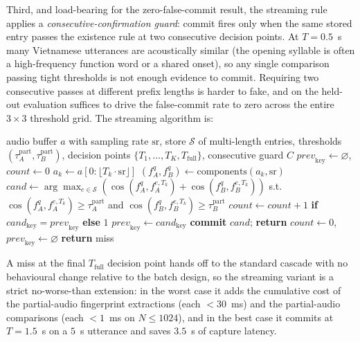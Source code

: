 \documentclass[a4paper,fleqn]{cas-dc}
\begin{document}
Third, and load-bearing for the zero-false-commit result, the streaming rule applies a \emph{consecutive-confirmation guard}: commit fires only when the same stored entry passes the existence rule at two consecutive decision points. At $T = 0.5$~s many Vietnamese utterances are acoustically similar (the opening syllable is often a high-frequency function word or a shared onset), so any single comparison passing tight thresholds is not enough evidence to commit. Requiring two consecutive passes at different prefix lengths is harder to fake, and on the held-out evaluation suffices to drive the false-commit rate to zero across the entire $3\times3$ threshold grid. The streaming algorithm is:

\begin{algorithm}[!h]
\caption{Streaming progressive two-stream cache lookup}
\label{alg:streaming}
\begin{algorithmic}[1]
\Require audio buffer $a$ with sampling rate $\mathrm{sr}$, store $\mathcal{S}$ of multi-length entries, thresholds $(\tau^{\mathrm{part}}_A, \tau^{\mathrm{part}}_B)$, decision points $\{T_1, \ldots, T_K, T_{\mathrm{full}}\}$, consecutive guard $C$
\State $\mathit{prev}_{\mathrm{key}} \gets \varnothing$, $\mathit{count} \gets 0$
  \State $a_k \gets a[0 : \lfloor T_k \cdot \mathrm{sr} \rfloor]$
  \State $(f_A^q, f_B^q) \gets \mathrm{components}(a_k, \mathrm{sr})$
  \State $\mathit{cand} \gets \arg\max_{e \in \mathcal{S}} (\cos(f_A^q, f_A^{e,T_k}) + \cos(f_B^q, f_B^{e,T_k}))$ \;s.t. $\cos(f_A^q, f_A^{e,T_k}) \ge \tau^{\mathrm{part}}_A$ and $\cos(f_B^q, f_B^{e,T_k}) \ge \tau^{\mathrm{part}}_B$
    \State $\mathit{count} \gets \mathit{count} + 1$ \textbf{if} $\mathit{cand}_{\mathrm{key}} = \mathit{prev}_{\mathrm{key}}$ \textbf{else} $1$
    \State $\mathit{prev}_{\mathrm{key}} \gets \mathit{cand}_{\mathrm{key}}$
     \textbf{commit} $\mathit{cand}$; \textbf{return}
    \EndIf
  \Else
    \State $\mathit{count} \gets 0$, $\mathit{prev}_{\mathrm{key}} \gets \varnothing$
  \EndIf
\EndFor
\State \textbf{return} miss
\end{algorithmic}
\end{algorithm}

A miss at the final $T_{\mathrm{full}}$ decision point hands off to the standard cascade with no behavioural change relative to the batch design, so the streaming variant is a strict no-worse-than extension: in the worst case it adds the cumulative cost of the partial-audio fingerprint extractions (each $< 30$~ms) and the partial-audio comparisons (each $< 1$~ms on $N \le 1024$), and in the best case it commits at $T = 1.5$~s on a $5$~s utterance and saves $3.5$~s of capture latency.
\end{document}
